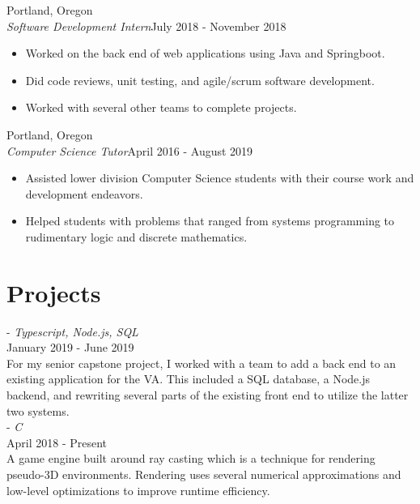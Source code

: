 \documentclass[12pt]{article}
\begin{document}
	\hfill Portland, Oregon\\
	\noindent \emph{Software Development Intern}\hfill July 2018 - November 2018
	\begin{itemize}[noitemsep]
		\item Worked on the back end of web applications using Java and Springboot.
		\item  Did code reviews, unit testing, and agile/scrum software development.
		\item  Worked with several other teams to complete projects.
	\end{itemize}

	\hfill Portland, Oregon\\
	\noindent\emph{Computer Science Tutor}\hfill April 2016 - August 2019
	\begin{itemize}[noitemsep]
		\item Assisted lower division Computer Science students with their course work and development endeavors.
		\item  Helped students with problems that ranged from systems programming to rudimentary logic and discrete mathematics.
	\end{itemize}


	\section*{Projects}
	 - \emph{Typescript, Node.js, SQL} \\
	\noindent January 2019 - June 2019 \\
	\noindent For my senior capstone project, I worked with a team to add a back end to an existing application for the VA.
	This included a SQL database, a Node.js backend, and rewriting several parts of the existing front end to utilize the latter two systems.
	\noindent \\

	\newpage
	 - \emph{C} \\
	\noindent April 2018 - Present \\
	\noindent A game engine built around ray casting which is a technique for rendering pseudo-3D environments. Rendering uses several numerical 
	approximations and low-level optimizations to improve runtime efficiency.\\
\end{document}
